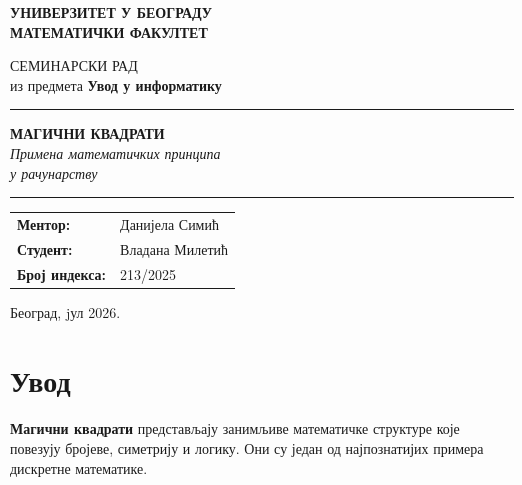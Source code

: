 \documentclass[12pt,a4paper]{article}
\begin{document}
\begin{titlepage}

\centering

\vspace*{2cm}

{\large\bfseries УНИВЕРЗИТЕТ У БЕОГРАДУ}\\[0.3cm]
{\large\bfseries МАТЕМАТИЧКИ ФАКУЛТЕТ}

\vspace{2cm}

{\large СЕМИНАРСКИ РАД}\\[0.3cm]
{\large из предмета}
{\Large\bfseries Увод у информатику}

\vspace{2.5cm}
\rule{0.75\textwidth}{0.8pt}

\vspace{0.6cm}

{\Large\bfseries МАГИЧНИ КВАДРАТИ}\\[0.35cm]

{\Large\itshape Примена математичких принципа}\\[0.15cm]
{\Large\itshape у рачунарству}

\vspace{0.6cm}

\rule{0.75\textwidth}{0.8pt}
\vspace{5cm}

\begin{flushleft}
\begin{tabular}{ll}
\textbf{Ментор:} & Данијела Симић \\[0.25cm]
\textbf{Студент:} & Владана Милетић\\[0.25cm]
\textbf{Број индекса:} & 213/2025
\end{tabular}
\end{flushleft}

\vspace{1.5cm}

{\large Београд, jул 2026.}

\end{titlepage}



\tableofcontents
\newpage



\section{Увод}


\textbf{Магични квадрати} представљају занимљиве математичке структуре које
повезују бројеве, симетрију и логику. Они су један од најпознатијих примера
дискретне математике.
\end{document}
